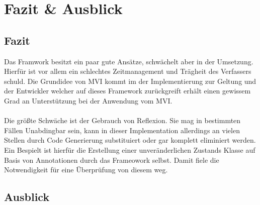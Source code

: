 \section{Fazit \& Ausblick}


\subsection{Fazit}
Das Framwork besitzt ein paar gute Ansätze, schwächelt aber in der Umsetzung. Hierfür ist vor allem ein schlechtes Zeitmanagement und Trägheit des Verfassers schuld. Die Grundidee von MVI kommt im der Implementierung zur Geltung und der Entwickler welcher auf dieses Framework zurückgreift erhält einen gewissem Grad an Unterstützung bei der Anwendung vom MVI.
\\\\
Die größte Schwäche ist der Gebrauch von Reflexion. Sie mag in bestimmten Fällen Unabdingbar sein, kann in dieser Implementation allerdings an vielen Stellen durch Code Generierung substituiert oder gar komplett eliminiert werden. Ein Bespielt ist hierfür die Erstellung einer unveränderlichen Zustands Klasse auf Basis von Annotationen durch das Frameowork selbst. Damit fiele die Notwendigkeit für eine Überprüfung von diesem weg.

\subsection{Ausblick}

